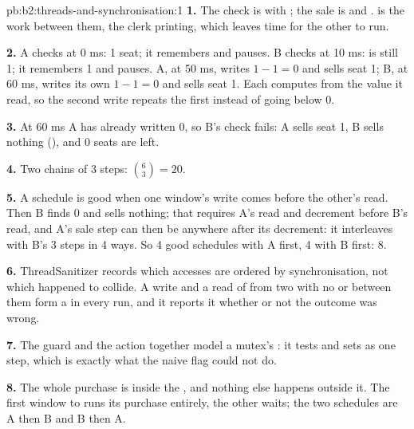 \begin{solution}{pb:b2:threads-and-synchronisation:1}
\textbf{1.} The check is  with ; the sale is
 and .  is the work between them, the clerk
printing, which leaves time for the other  to run.

\textbf{2.} A checks at 0 ms: 1 seat; it remembers  and pauses. B checks at 10 ms:  is
still 1; it remembers 1 and pauses. A, at 50 ms, writes $1 - 1 = 0$ and sells seat 1; B, at 60 ms, writes its own
$1 - 1 = 0$ and sells seat 1. Each computes from the value it read, so the second write repeats the first instead of
going below 0.

\textbf{3.} At 60 ms A has already written 0, so B's check fails: A sells seat 1, B sells nothing (),
and 0 seats are left.

\textbf{4.} Two chains of 3 steps: $\binom{6}{3} = 20$.

\textbf{5.} A schedule is good when one window's write comes before the other's read. Then B finds 0 and sells
nothing; that requires A's read and decrement before B's read, and A's sale step
can then be anywhere after its decrement: it interleaves with B's 3 steps in 4 ways. So 4 good schedules with A
first, 4 with B first: 8.

\textbf{6.} ThreadSanitizer records which accesses are ordered by synchronisation, not which happened to collide. A
write and a read of  from two  with no  or  between them form a  in every
run, and it reports it whether or not the outcome was wrong.

\textbf{7.} The guard  and the action  together model a mutex's : it tests and sets
as one  step, which is exactly what the naive flag  could not do.

\textbf{8.} The whole purchase is inside the , and nothing else happens outside it. The first window to  runs
its purchase entirely, the other waits; the two schedules are A then B and B then A.


\end{solution}
